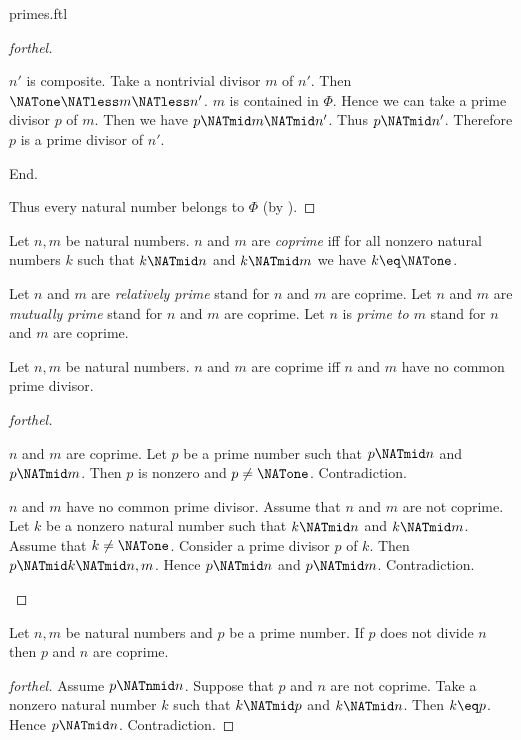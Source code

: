 \documentclass{naproche-library}
\begin{document}
\begin{smodule}[title=Prime Numbers]{primes.ftl}
\begin{proof}[forthel]
    \begin{case}{$n'$ is composite.}
      Take a nontrivial divisor $m$ of $n'$.
      Then $\NATone \NATless m \NATless n'$.
      $m$ is contained in $\Phi$.
      Hence we can take a prime divisor $p$ of $m$.
      Then we have $p \NATmid m \NATmid n'$.
      Thus $p \NATmid n'$.
      Therefore $p$ is a prime divisor of $n'$.
    \end{case}
  End.

  Thus every natural number belongs to $\Phi$ (by ).
\end{proof}

\begin{definition}[forthel,id=ARITHMETIC_10_463197419077632]
  Let $n, m$ be natural numbers.
  $n$ and $m$ are \emph{coprime} iff for all nonzero natural numbers $k$ such that $k \NATmid n$ and $k \NATmid m$ we have $k \eq \NATone$.

  Let $n$ and $m$ are \emph{relatively prime} stand for $n$ and $m$ are coprime.
  Let $n$ and $m$ are \emph{mutually prime} stand for $n$ and $m$ are coprime.
  Let $n$ is \emph{prime to $m$} stand for $n$ and $m$ are coprime.
\end{definition}

\begin{proposition}[forthel,id=ARITHMETIC_10_5776394594287616]
  Let $n, m$ be natural numbers.
  $n$ and $m$ are coprime iff $n$ and $m$ have no common prime divisor.
\end{proposition}
\begin{proof}[forthel]
  \begin{case}{$n$ and $m$ are coprime.}
    Let $p$ be a prime number such that $p \NATmid n$ and $p \NATmid m$.
    Then $p$ is nonzero and $p \neq \NATone$.
    Contradiction.
  \end{case}

  \begin{case}{$n$ and $m$ have no common prime divisor.}
    Assume that $n$ and $m$ are not coprime.
    Let $k$ be a nonzero natural number such that $k \NATmid n$ and $k \NATmid m$.
    Assume that $k \neq \NATone$.
    Consider a prime divisor $p$ of $k$.
    Then $p \NATmid k \NATmid n,m$.
    Hence $p \NATmid n$ and $p \NATmid m$.
    Contradiction.
  \end{case}
\end{proof}

\begin{proposition}[forthel,id=ARITHMETIC_10_7212152851005440]
  Let $n, m$ be natural numbers and $p$ be a prime number.
  If $p$ does not divide $n$ then $p$ and $n$ are coprime.
\end{proposition}
\begin{proof}[forthel]
  Assume $p \NATnmid n$.
  Suppose that $p$ and $n$ are not coprime.
  Take a nonzero natural number $k$ such that $k \NATmid p$ and $k \NATmid n$.
  Then $k \eq p$.
  Hence $p \NATmid n$.
  Contradiction.
\end{proof}


\end{smodule}
\end{document}
